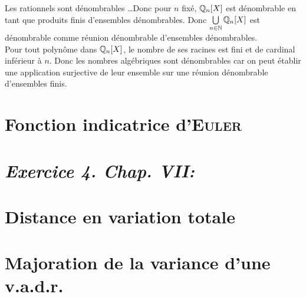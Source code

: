 \begin{solution}
Les rationnels sont dénombrables \dots Donc pour $n$ fixé, $\mathbb{Q}_n[X]$ est dénombrable en tant que produits finis d'ensembles dénombrables.
Donc $\bigcup\limits_{n \in \mathbb{N}} \mathbb{Q}_n[X]$ est dénombrable comme réunion dénombrable d'ensembles dénombrables. \\
Pour tout polynôme dans $\mathbb{Q}_n[X]$, le nombre de ses racines est fini et de cardinal inférieur à $n$. 
Donc les nombres algébriques sont dénombrables car on peut établir une application surjective de leur ensemble sur une réunion dénombrable d'ensembles finis. 
\end{solution}


\section{Fonction indicatrice d'\textsc{Euler}}


\section{\emph{Exercice 4. Chap. VII:}}


\section{Distance en variation totale}


\section{Majoration de la variance d'une v.a.d.r.}


